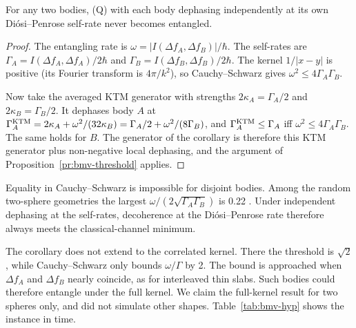 \begin{corollary}\label{co:bmv-any}
For any two bodies, (Q) with each body dephasing independently at its own Di\'osi--Penrose self-rate never becomes entangled.
\end{corollary}

\begin{proof}
The entangling rate is $\omega=|I(\Delta f_A,\Delta f_B)|/\hbar$. The self-rates are $\Gamma_A=I(\Delta f_A,\Delta f_A)/2\hbar$ and
$\Gamma_B=I(\Delta f_B,\Delta f_B)/2\hbar$. The kernel $1/|x-y|$ is positive (its Fourier transform is $4\pi/k^2$), so Cauchy--Schwarz gives
$\omega^2\le4\Gamma_A\Gamma_B$.

Now take the averaged KTM generator with strengths $2\kappa_A=\Gamma_A/2$ and $2\kappa_B=\Gamma_B/2$. It dephases body $A$ at
$\Gamma_A^{\rm KTM}=2\kappa_A+\omega^2/(32\kappa_B)=\Gamma_A/2+\omega^2/(8\Gamma_B)$, and $\Gamma_A^{\rm KTM}\le\Gamma_A$ iff
$\omega^2\le4\Gamma_A\Gamma_B$. The same holds for $B$. The generator of the corollary is therefore this KTM generator plus non-negative
local dephasing, and the argument of Proposition~\ref{pr:bmv-threshold} applies.
\end{proof}

Equality in Cauchy--Schwarz is impossible for disjoint bodies. Among the random two-sphere geometries the largest
$\omega/(2\sqrt{\Gamma_A\Gamma_B})$ is 0.22 . Under independent dephasing at the self-rates, decoherence at the
Di\'osi--Penrose rate therefore always meets the classical-channel minimum.

The corollary does not extend to the correlated kernel. There the threshold is $\sqrt2$, while Cauchy--Schwarz only bounds $\omega/\Gamma$ by
2. The bound is approached when $\Delta f_A$ and $\Delta f_B$ nearly coincide, as for interleaved thin slabs. Such bodies could therefore
entangle under the full kernel. We claim the full-kernel result for two spheres only, and did not simulate other shapes.
Table~\ref{tab:bmv-hyp} shows the instance in time.

